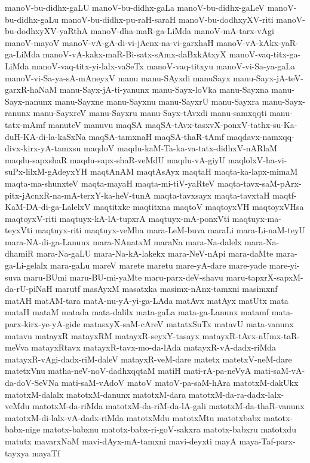 {manoV-bu-didhx-gaLU
manoV-bu-didhx-gaLa
manoV-bu-didhx-gaLeV
manoV-bu-didhx-gaLu
manoV-bu-didhx-pu-raH-saraH
manoV-bu-dodhxyXV-riti
manoV-bu-dodhxyXV-yaRthA
manoV-dha-maR-ga-LiMda
manoV-mA-tarx-vAgi
manoV-mayoV
manoV-vA-gA-di-vi-jAcnx-na-vi-garxhaH
manoV-vA-kAkx-yaR-ga-LiMda
manoV-vA-kakx-maR-Bi-satx-sAmx-daBxkAtxyX
manoV-vaq-titx-ga-LiMda
manoV-vaq-titx-yi-lalx-vaSeTx
manoV-vaq-titxyu
manoV-vi-Sa-ya-gaLa
manoV-vi-Sa-ya-sA-mAneyxV
manu
manu-SAyxdi
manuSayx
manu-Sayx-jA-teV-garxR-haNaM
manu-Sayx-jA-ti-yanunx
manu-Sayx-loVka
manu-Sayxna
manu-Sayx-nanunx
manu-Sayxne
manu-Sayxnu
manu-SayxrU
manu-Sayxra
manu-Sayx-ranunx
manu-SayxreV
manu-Sayxru
manu-Sayx-tAvxdi
manu-samxqqti
manu-tatx-mAmf
manuteV
manuvu
maqSA
maqSA-tAvx-tasxvX-ponxV-tathx-su-Ka-duH-KA-di-la-kaSxNa
maqSA-tamxnaH
maqSA-thaR-tAmf
maqdavx-namxqq-divx-kirx-yA-tamxsu
maqdoV
maqdu-kaM-Ta-ka-va-tatx-didhxV-nARlaM
maqdu-sapxshaR
maqdu-sapx-shaR-veMdU
maqdu-vA-giyU
maqlolxV-ha-vi-suPx-lilxM-gAdeyxYH
maqtAnAM
maqtAsAyx
maqtaH
maqta-ka-lapx-mimaM
maqta-ma-shunxteV
maqta-mayaH
maqta-mi-tiV-yaRteV
maqta-tavx-saM-pArx-pitx-jAcnxR-na-mA-terxY-ka-heV-tunA
maqta-tavxsayx
maqta-tavxtaH
maqtf-KaM-DA-di-ga-LalelxV
maqtitxke
maqtitxna
maqtoV
maqtoyxVH
maqtoyxVHsa
maqtoyxV-riti
maqtuyx-kA-lA-tupxrA
maqtuyx-mA-ponxVti
maqtuyx-ma-teyxVti
maqtuyx-riti
maqtuyx-veMba
mara-LeM-buva
maraLi
mara-Li-naM-teyU
mara-NA-di-ga-Lanunx
mara-NAnatxM
maraNa
mara-Na-dalelx
mara-Na-dhamiR
mara-Na-gaLU
mara-Na-kA-lakekx
mara-NeV-nApi
mara-daMte
mara-ga-Li-gelalx
mara-gaLu
mareV
marete
maretu
mare-yA-dare
mare-yade
mare-yi-suva
maru-BUmi
maru-BU-mi-yaMte
maru-parx-deV-shavu
maru-tapxrX-sapxM-da-rU-piNaH
marutf
masAyxM
masatxka
masimx-nAnx-tamxni
masimxnf
matAH
matAM-tara
matA-nu-yA-yi-ga-LAda
matAvx
matAyx
matUtx
mata
mataH
mataM
matada
mata-dalilx
mata-gaLa
mata-ga-Lanunx
matamf
mata-parx-kirx-ye-yA-gide
matasxyX-saM-cAreV
matatxSuTx
matavU
mata-vanunx
matavu
matayxR
matayxRM
matayxR-seyxY-tasayx
matayxR-tAvx-nUmx-taR-meVva
matayxRtavx
matayxR-tavx-mo-da-lAda
matayxR-vA-dadx-riMda
matayxR-vAgi-dadx-riM-daleV
matayxR-veM-dare
matetx
matetxV-neM-dare
matetxVnu
matha-neV-noV-dadhxqqtaM
matiH
mati-rA-pa-neVyA
mati-saM-vA-da-doV-SeVNa
mati-saM-vAdoV
matoV
matoV-pa-saM-hAra
matotxM-dakUkx
matotxM-dalalx
matotxM-danunx
matotxM-dara
matotxM-da-ra-dadx-lalx-veMdu
matotxM-da-riMda
matotxM-da-riM-da-lA-gali
matotxM-da-thaR-vanunx
matotxM-di-lalx-vA-dadx-riMda
matotxMdu
matotxMtu
matotxbabx
matotx-babx-nige
matotx-babxnu
matotx-babx-ri-goV-sakxra
matotx-babxru
matotxdu
matutx
mavarxNaM
mavi-dAyx-mA-tamxni
mavi-deyxti
mayA
maya-Taf-parx-tayxya
mayaTf
}
